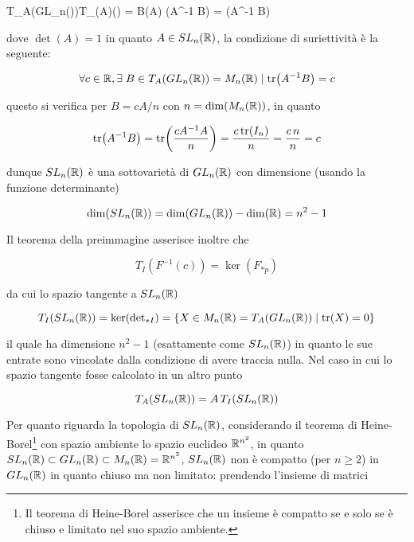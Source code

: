 	{T_{A}(GL_{n}(\R))}{T_{\det(A)}(\R) = \R}
	{B}{\det(A) \tr(A^{-1} B) = \tr(A^{-1} B)}
	
dove $ \det(A) = 1 $ in quanto $ A \in SL_{n}(\mathbb{R}) $, la condizione di suriettività è la seguente:

\begin{equation}
	\forall c \in \mathbb{R}, \exists \; B \in T_{A}(GL_{n}(\mathbb{R})) = M_{n}(\mathbb{R}) \mid \tr(A^{-1} B) = c
\end{equation}

questo si verifica per $ B = c A / n $ con $ n = \dim(M_{n}(\mathbb{R})) $, in quanto

\begin{equation}
	\tr(A^{-1} B) = \tr(\dfrac{c A^{-1} A}{n}) %
	= \dfrac{c \tr(I_{n})}{n} %
	= \dfrac{c \, n}{n} %
	= c
\end{equation}

dunque $ SL_{n}(\mathbb{R}) $ è una sottovarietà di $ GL_{n}(\mathbb{R}) $ con dimensione (usando la funzione determinante)

\begin{equation}
	\dim(SL_{n}(\mathbb{R})) = \dim(GL_{n}(\mathbb{R})) - \dim(\mathbb{R}) = n^{2} - 1
\end{equation}

Il teorema della preimmagine asserisce inoltre che

\begin{equation}
	T_{I}(F^{-1}(c)) = \ker(F_{*p})
\end{equation}

da cui lo spazio tangente a $ SL_{n}(\mathbb{R}) $

\begin{equation}
	T_{I}(SL_{n}(\R)) = \ker({\det}_{*I}) %
	= \{ X \in M_{n}(\R) = T_{A}(GL_{n}(\R)) \mid \tr(X) = 0 \}
\end{equation}

il quale ha dimensione $ n^{2} - 1 $ (esattamente come $ SL_{n}(\mathbb{R}) $) in quanto le sue entrate sono vincolate dalla condizione di avere traccia nulla. Nel caso in cui lo spazio tangente fosse calcolato in un altro punto

\begin{equation}
	T_{A}(SL_{n}(\mathbb{R})) = A \, T_{I}(SL_{n}(\mathbb{R}))
\end{equation}

Per quanto riguarda la topologia di $ SL_{n}(\mathbb{R}) $, considerando il teorema di Heine-Borel\footnote{%
	Il teorema di Heine-Borel asserisce che un insieme è compatto se e solo se è chiuso e limitato nel suo spazio ambiente.%
} con spazio ambiente lo spazio euclideo $ \mathbb{R}^{n^{2}} $, in quanto $ SL_{n}(\mathbb{R}) \subset GL_{n}(\mathbb{R}) \subset M_{n}(\mathbb{R}) = \mathbb{R}^{n^{2}} $, $ SL_{n}(\mathbb{R}) $ non è compatto (per $ n \geqslant 2 $) in $ GL_{n}(\mathbb{R}) $ in quanto chiuso ma non limitato: prendendo l'insieme di matrici

